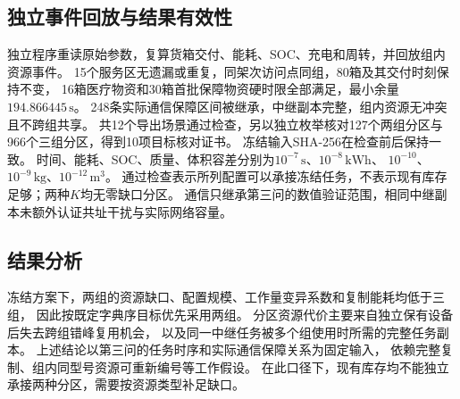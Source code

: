\subsection{独立事件回放与结果有效性}
独立程序重读原始参数，复算货箱交付、能耗、SOC、充电和周转，并回放组内资源事件。
15个服务区无遗漏或重复，同架次访问点同组，80箱及其交付时刻保持不变，
16箱医疗物资和30箱首批保障物资硬时限全部满足，最小余量$194.866445\,\mathrm{s}$。
248条实际通信保障区间被继承，中继副本完整，组内资源无冲突且不跨组共享。
共12个导出场景通过检查，另以独立枚举核对127个两组分区与966个三组分区，得到10项目标核对证书。
冻结输入SHA-256在检查前后保持一致。
时间、能耗、SOC、质量、体积容差分别为$10^{-7}\,\mathrm{s}$、$10^{-8}\,\mathrm{kWh}$、
$10^{-10}$、$10^{-9}\,\mathrm{kg}$、$10^{-12}\,\mathrm{m^3}$。
通过检查表示所列配置可以承接冻结任务，不表示现有库存足够；两种$K$均无零缺口分区。
通信只继承第三问的数值验证范围，相同中继副本未额外认证共址干扰与实际网络容量。

\subsection{结果分析}
冻结方案下，两组的资源缺口、配置规模、工作量变异系数和复制能耗均低于三组，
因此按既定字典序目标优先采用两组。
分区资源代价主要来自独立保有设备后失去跨组错峰复用机会，
以及同一中继任务被多个组使用时所需的完整任务副本。
上述结论以第三问的任务时序和实际通信保障关系为固定输入，
依赖完整复制、组内同型号资源可重新编号等工作假设。
在此口径下，现有库存均不能独立承接两种分区，需要按资源类型补足缺口。
